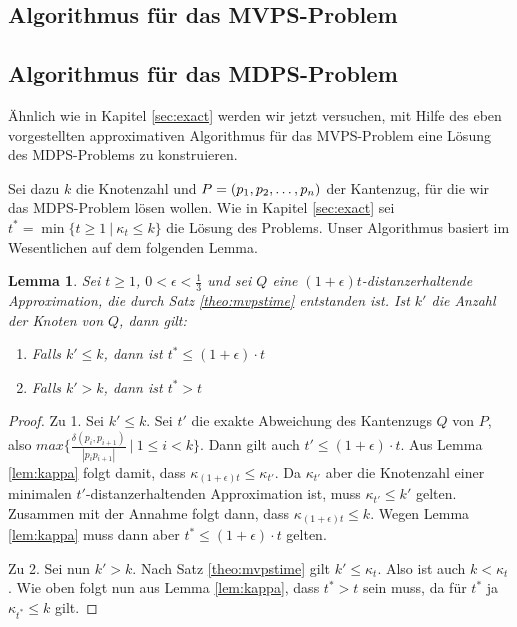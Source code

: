 \documentclass[11pt]{article}
\newtheorem{lemma}[theorem]{Lemma}
\begin{document}
    \subsection{Algorithmus für das MVPS-Problem}
    \label{subsec:mvps}
	
    
    \subsection{Algorithmus für das MDPS-Problem}
    \label{subsec:mdps}
	Ähnlich wie in Kapitel \ref{sec:exact} werden wir jetzt versuchen, mit Hilfe des eben vorgestellten approximativen Algorithmus für das MVPS-Problem eine Lösung des MDPS-Problems zu konstruieren.
	
	Sei dazu $k$ die Knotenzahl und $P = (p_1, p_2, \mathellipsis, p_n)$ der Kantenzug, für die wir das MDPS-Problem lösen wollen. 
	Wie in Kapitel \ref{sec:exact} sei $t^* = \min\{t \geq 1\ |\ \kappa_t \leq k\}$ die Lösung des Problems. 
	Unser Algorithmus basiert im Wesentlichen auf dem folgenden Lemma.
	
	\begin{lemma}
		\label{lem:tstar}
		Sei $t \geq 1$, $0 < \epsilon < \frac{1}{3}$ und sei $Q$ eine $(1 + \epsilon)t$-distanzerhaltende Approximation, die durch Satz \ref{theo:mvpstime} entstanden ist. Ist $k'$ die Anzahl der Knoten von $Q$, dann gilt:
		\begin{enumerate}
			\item Falls $k' \leq k$, dann ist $t^* \leq (1 + \epsilon) \cdot t$
			\item Falls $k' > k$, dann ist $t^* > t$
		\end{enumerate}
	\end{lemma}
	\begin{proof}
		Zu 1. Sei $k' \leq k$. Sei $t'$ die exakte Abweichung des Kantenzugs $Q$ von $P$, also $max\{\frac{\delta(p_i, p_{i+1})}{|p_ip_{i+1}|}\ |\ 1 \leq i < k\}$. 
		Dann gilt auch $t' \leq (1 + \epsilon) \cdot t$. 
		Aus Lemma \ref{lem:kappa} folgt damit, dass $\kappa_{(1 + \epsilon)t} \leq \kappa_{t'}$.
		Da $\kappa_{t'}$ aber die Knotenzahl einer minimalen $t'$-distanzerhaltenden Approximation ist, muss $\kappa_{t'} \leq k'$ gelten. Zusammen mit der Annahme folgt dann, dass $\kappa_{(1 + \epsilon)t} \leq k$. Wegen Lemma \ref{lem:kappa} muss dann aber $t^* \leq (1 + \epsilon) \cdot t$ gelten.
		
		Zu 2. Sei nun $k' > k$. Nach Satz \ref{theo:mvpstime} gilt $k' \leq \kappa_t$. Also ist auch $k < \kappa_t$. Wie oben folgt nun aus Lemma \ref{lem:kappa}, dass $t^* > t$ sein muss, da für $t^*$ ja $\kappa_{t^*} \leq k$ gilt.		
	\end{proof}
	
\end{document}
